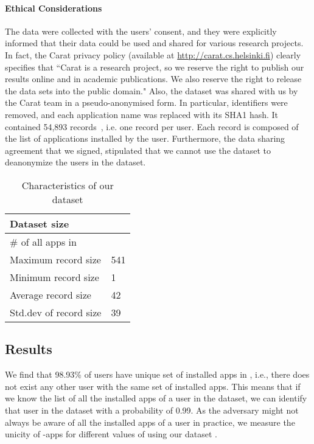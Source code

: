 \documentclass{acm_proc_article-sp}
\theoremstyle{plain}
\theoremstyle{plain}
\theoremstyle{plain}
\theoremstyle{plain}
\theoremstyle{plain}
\theoremstyle{plain}
\begin{document}
\paragraph{Ethical Considerations}
The data were collected with the users' consent, and they were explicitly informed that their data could be used and shared for various research projects.
In fact, the Carat privacy policy (available at \url{http://carat.cs.helsinki.fi}) clearly specifies that ``Carat is a research project, so we reserve the right to publish our results online and in academic publications. 
We also reserve the right to release the data sets into the public domain."
Also, the dataset was shared with us by the Carat team in a pseudo-anonymised form. 
In particular, identifiers were removed, and each application name was replaced with its SHA1 hash. 
It contained 54,893 records~\cite{Truong:2014}, i.e. one record per user. 
Each record is composed of the list of applications installed by the user.
Furthermore, the data sharing agreement that we signed, stipulated that we cannot use the dataset to deanonymize the users in the dataset.


\begin{table}
\centering
\begin{tabular}{|l|l|}
\hline
Dataset size  &  \\ \hline 
\# of all apps in  &  \\ \hline
Maximum record size  & 541\\ \hline
Minimum record size  & 1 \\ \hline
Average record size & 42 \\ \hline
Std.dev of record size & 39 \\ \hline
\end{tabular}
\caption{\label{tab:D} Characteristics of our dataset }
\end{table}



\subsection{Results}

We find that 98.93\% of users have unique set of installed apps in , i.e., there does not exist any other user with the same set of installed apps.
This means that if we know the list of all the installed apps of a user in the dataset, we can identify that user in the dataset with a probability of 0.99.
As the adversary might not always be aware of all the installed apps of a user in practice, we measure the unicity of -apps for different values of  using our dataset . 
\end{document}
